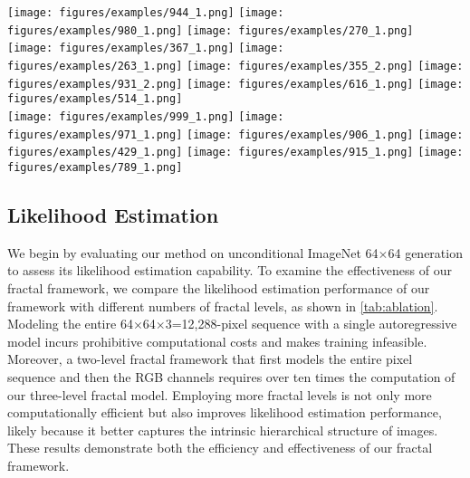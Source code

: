 \documentclass{article}
\newcommand{\hhs}{\hspace{-0.001em}}
\newcommand{\vvs}{\vspace{-.1em}}
\begin{document}
\begin{figure*}[t]
\centering
\texttt{[image: figures/examples/944\_1.png]}\hhs
    \texttt{[image: figures/examples/980\_1.png]}\hhs
    \texttt{[image: figures/examples/270\_1.png]}\vvs
    \\
    \texttt{[image: figures/examples/367\_1.png]}\hhs
    \texttt{[image: figures/examples/263\_1.png]}\hhs
    \texttt{[image: figures/examples/355\_2.png]}\hhs
    \texttt{[image: figures/examples/931\_2.png]}\hhs
    \texttt{[image: figures/examples/616\_1.png]}\vvs
    \texttt{[image: figures/examples/514\_1.png]}\hhs
    \\
    \texttt{[image: figures/examples/999\_1.png]}\hhs
    \texttt{[image: figures/examples/971\_1.png]}\hhs
    \texttt{[image: figures/examples/906\_1.png]}\hhs
    \texttt{[image: figures/examples/429\_1.png]}\hhs
    \texttt{[image: figures/examples/915\_1.png]}\hhs
    \texttt{[image: figures/examples/789\_1.png]}\vvs
    \label{fig:qualitative}
\end{figure*}

\subsection{Likelihood Estimation}

We begin by evaluating our method on unconditional ImageNet 64$\times$64 generation to assess its likelihood estimation capability. To examine the effectiveness of our fractal framework, we compare the likelihood estimation performance of our framework with different numbers of fractal levels, as shown in \autoref{tab:ablation}. Modeling the entire  64$\times$64$\times$3=12,288-pixel sequence with a single autoregressive model incurs prohibitive computational costs and makes training infeasible. Moreover, a two-level fractal framework that first models the entire pixel sequence and then the RGB channels requires over ten times the computation of our three-level fractal model. Employing more fractal levels is not only more computationally efficient but also improves likelihood estimation performance, likely because it better captures the intrinsic hierarchical structure of images. These results demonstrate both the efficiency and effectiveness of our fractal framework.
 
\end{document}
